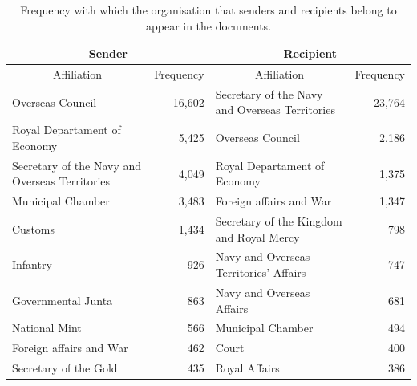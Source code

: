 \documentclass{article}
\begin{document}
\begin{table}[]
	\vspace{0.2cm}
	\centering
	\caption{Frequency with which the organisation that senders and recipients belong to appear in the documents. \label{tb:affiliations}}
	\vspace{0.2cm}
	\begin{tabular}{|p{5.5cm}|r|p{5.5cm}|r|}
		\hline
		\multicolumn{2}{|c|}{Sender}                                                    & \multicolumn{2}{c|}{Recipient}                                                  \\ \hline
		\multicolumn{1}{|c|}{Affiliation}              & \multicolumn{1}{c|}{Frequency} & \multicolumn{1}{c|}{Affiliation}               & \multicolumn{1}{c|}{Frequency} \\ \hline
		Overseas Council                               & 16,602                         & Secretary of the Navy and Overseas Territories & 23,764                         \\ \hline
		Royal Departament of Economy                   & 5,425                          & Overseas Council                               & 2,186                          \\ \hline
		Secretary of the Navy and Overseas Territories & 4,049                          & Royal Departament of Economy                   & 1,375                          \\ \hline
		Municipal Chamber                              & 3,483                          & Foreign affairs and War                        & 1,347                          \\ \hline
		Customs                                        & 1,434                          & Secretary of the Kingdom and Royal Mercy       & 798                            \\ \hline
		Infantry                                       & 926                            & Navy and Overseas Territories’ Affairs         & 747                            \\ \hline
		Governmental Junta                             & 863                            & Navy and Overseas Affairs                      & 681                            \\ \hline
		National Mint                                  & 566                            & Municipal Chamber                              & 494                            \\ \hline
		Foreign affairs and War                        & 462                            & Court                                          & 400                            \\ \hline
		Secretary of the Gold                          & 435                            & Royal Affairs                                  & 386                            \\ \hline
	\end{tabular}
\end{table}
\end{document}

